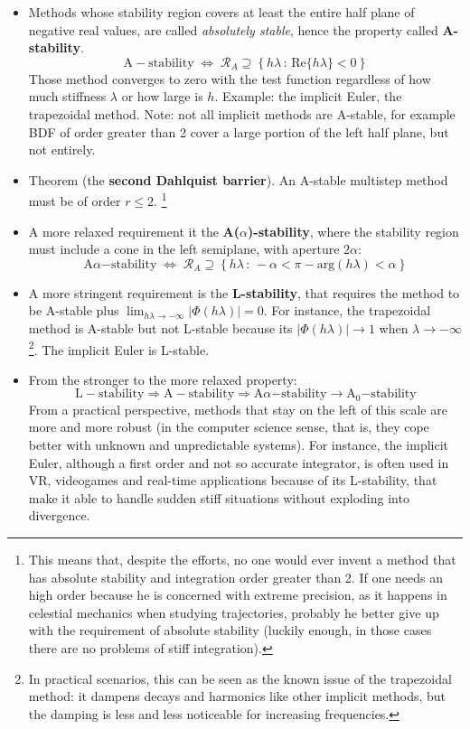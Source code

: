 \documentclass{digitaldynamics}
\begin{document}
\begin{itemize}
	\item 
	Methods whose stability region covers at least the entire half plane of negative real values, are called \textit{absolutely stable}, hence the property called \textbf{A-stability}. 
	\[
	\mathrm{A-stability} \; \Leftrightarrow \; \mathcal{R}_A \supseteq \left\{ h \lambda \, : \,  \mathrm{Re} \{h \lambda\} < 0 \right\}
	\]
	Those method converges to zero with the test function regardless of how much stiffness $\lambda$ or how large is $h$. Example: the implicit Euler, the trapezoidal method. Note: not all implicit methods are A-stable, for example BDF of order greater than 2 cover a large portion of the left half plane, but not entirely. 
	
	
	\item 
	Theorem (the \textbf{second Dahlquist barrier}). An A-stable multistep method must be of order $r\leq 2$. 
	\footnote{This means that, despite the efforts, no one would ever invent a method that has absolute stability and integration order greater than 2. If one needs an
	high order because he is concerned with extreme precision, as it happens in celestial mechanics when studying trajectories, probably he better give up with 
	the requirement of absolute stability (luckily enough, in those cases there are no problems of stiff integration).}
	
	\item 
	A more relaxed requirement it the \textbf{A($\alpha$)-stability}, where the stability region must include a cone in the left semiplane, with aperture $2\alpha$:
	\[
	\mathrm{A}\alpha\mathrm{-stability} \; \Leftrightarrow \; \mathcal{R}_A \supseteq \left\{ h \lambda \, : \,  -\alpha < \pi - \mathrm{arg}(h \lambda) < \alpha \right\}
	\]
	
	\item 
	A more stringent requirement is the \textbf{L-stability}, that requires the method to be A-stable plus $\lim_{ h \lambda \rightarrow -\infty} |\Phi(h \lambda)| = 0 $. For instance, the trapezoidal method is A-stable but not L-stable because its $|\Phi(h \lambda)| \rightarrow 1$ when $\lambda \rightarrow -\infty$\footnote{In practical scenarios, this can be seen as the known issue of the trapezoidal method: it dampens decays and harmonics like other implicit methods, but the damping is less and less noticeable for increasing frequencies.}. The implicit Euler is L-stable. 
	
	\item
	From the stronger to the more relaxed property:
	\[
	\mathrm{L-stability}  \Rightarrow \mathrm{A-stability}  \Rightarrow \mathrm{A}\alpha\mathrm{-stability} \rightarrow \mathrm{A}_0\mathrm{-stability}  
	\]
	From a practical perspective, methods that stay on the left of this scale are more and more robust (in the computer science sense, that is, they cope better with unknown and unpredictable systems). For instance, the implicit Euler, although a first order and not so accurate integrator, is often used in VR, videogames and real-time applications because of its L-stability, that make it able to handle sudden stiff situations without exploding into divergence.
	

\end{itemize}
\end{document}

